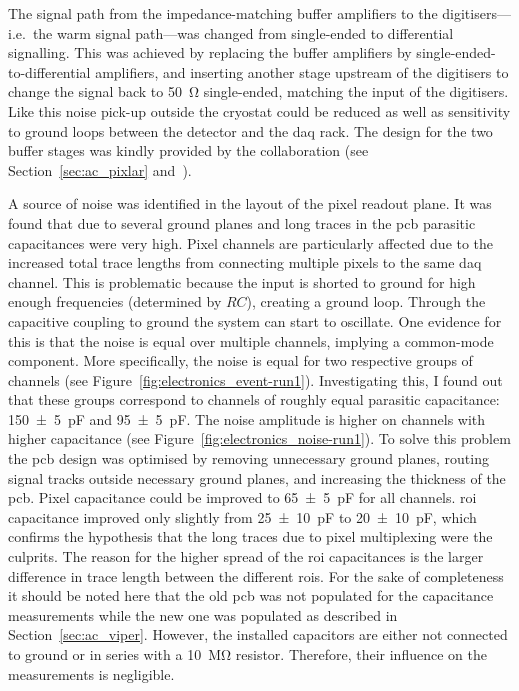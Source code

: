 The signal path from the impedance-matching buffer amplifiers to the digitisers---i.e.\ the warm signal path---was changed from single-ended to differential signalling.
This was achieved by replacing the buffer amplifiers by single-ended-to-differential amplifiers, and inserting another stage upstream of the digitisers to change the signal back to \SI{50}{\ohm} single-ended, matching the input of the digitisers.
Like this noise pick-up outside the cryostat could be reduced as well as sensitivity to ground loops between the detector and the \gls{daq} rack.
The design for the two buffer stages was kindly provided by the \lariat{} collaboration (see Section~\ref{sec:ac_pixlar} and~\cite{lariat}).

A source of noise was identified in the layout of the pixel readout plane.
It was found that due to several ground planes and long traces in the \gls{pcb} parasitic capacitances were very high.
Pixel channels are particularly affected due to the increased total trace lengths from connecting multiple pixels to the same \gls{daq} channel.
This is problematic because the input is shorted to ground for high enough frequencies (determined by $RC$), creating a ground loop.
Through the capacitive coupling to ground the system can start to oscillate.
One evidence for this is that the noise is equal over multiple channels, implying a common-mode component.
More specifically, the noise is equal for two respective groups of channels (see Figure~\ref{fig:electronics_event-run1}).
Investigating this, I found out that these groups correspond to channels of roughly equal parasitic capacitance: \SI{150 +- 5}{\pico\farad} and \SI{95 +- 5}{\pico\farad}.
The noise amplitude is higher on channels with higher capacitance (see Figure~\ref{fig:electronics_noise-run1}).
To solve this problem the \gls{pcb} design was optimised by removing unnecessary ground planes, routing signal tracks outside necessary ground planes, and increasing the thickness of the \gls{pcb}.
Pixel capacitance could be improved to \SI{65 +- 5}{\pico\farad} for all channels.
\gls{roi} capacitance improved only slightly from \SI{25 +- 10}{\pico\farad} to \SI{20 +- 10}{\pico\farad}, which confirms the hypothesis that the long traces due to pixel multiplexing were the culprits.
The reason for the higher spread of the \gls{roi} capacitances is the larger difference in trace length between the different \glspl{roi}.
For the sake of completeness it should be noted here that the old \gls{pcb} was not populated for the capacitance measurements while the new one was populated as described in Section~\ref{sec:ac_viper}.
However, the installed capacitors are either not connected to ground or in series with a \SI{10}{\mega\ohm} resistor.
Therefore, their influence on the measurements is negligible.

